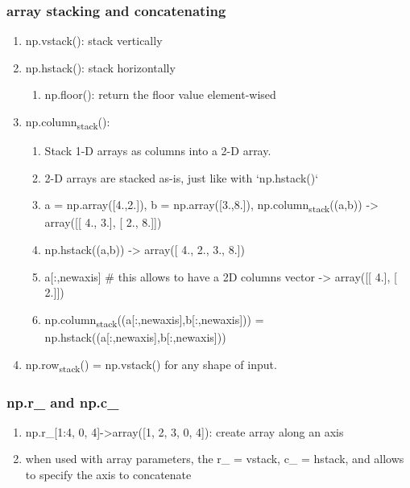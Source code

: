 \documentclass[11pt]{article}
\begin{document}
\subsubsection{array stacking and concatenating}
\label{sec:org233ae96}
\begin{enumerate}
\item np.vstack(): stack vertically
\label{sec:org2f64911}
\item np.hstack(): stack horizontally
\label{sec:orgc1ca333}
\begin{enumerate}
\item np.floor(): return the floor value element-wised
\label{sec:orgb29b2ac}
\end{enumerate}
\item np.column\textsubscript{stack}():
\label{sec:org2e7c798}
\begin{enumerate}
\item Stack 1-D arrays as columns into a 2-D array.
\label{sec:orgf1e43e1}
\item 2-D arrays are stacked as-is, just like with `np.hstack()`
\label{sec:org5f6a8e0}
\item a = np.array([4.,2.]), b = np.array([3.,8.]), np.column\textsubscript{stack}((a,b)) -> array([[ 4., 3.], [ 2., 8.]])
\label{sec:orga25bb1c}
\item np.hstack((a,b)) -> array([ 4., 2., 3., 8.])
\label{sec:org7de9d9e}
\item a[:,newaxis] \# this allows to have a 2D columns vector -> array([[ 4.], [ 2.]])
\label{sec:orgc0a2241}
\item np.column\textsubscript{stack}((a[:,newaxis],b[:,newaxis])) = np.hstack((a[:,newaxis],b[:,newaxis]))
\label{sec:org8e4493b}
\end{enumerate}
\item np.row\textsubscript{stack}() = np.vstack() for any shape of input.
\label{sec:orge12223b}
\end{enumerate}
\subsubsection{np.r\_ and np.c\_}
\label{sec:orgb70ba27}
\begin{enumerate}
\item np.r\_[1:4, 0, 4]->array([1, 2, 3, 0, 4]): create array along an axis
\label{sec:org6bdef5f}
\item when used with array parameters, the r\_ = vstack, c\_ = hstack, and allows to specify the axis to concatenate
\label{sec:org3077342}
\end{enumerate}
\end{document}
